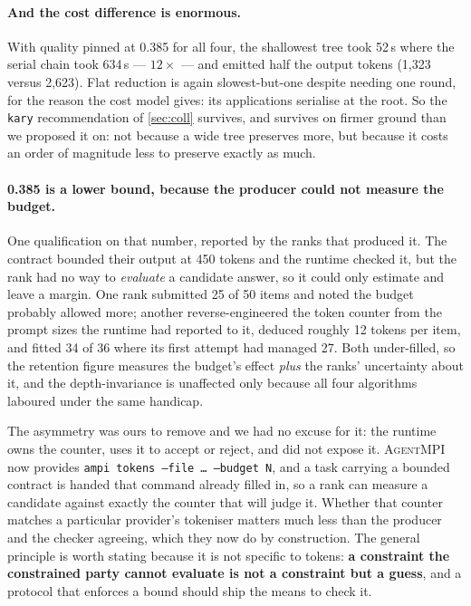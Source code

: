 \documentclass[10pt,twocolumn]{article}
\theoremstyle{definition}
\theoremstyle{plain}
\newcommand{\ampi}{\textsc{AgentMPI}}
\newcommand{\code}[1]{\texttt{\small #1}}
\begin{document}
\paragraph{And the cost difference is enormous.} With quality pinned at 0.385 for all
four, the shallowest tree took 52\,s where the serial chain took 634\,s ---
$12\times$ --- and emitted half the output tokens (1{,}323 versus 2{,}623). Flat reduction
is again slowest-but-one despite needing one round, for the reason the cost model gives:
its applications serialise at the root. So the \code{kary} recommendation of
\cref{sec:coll} survives, and survives on firmer ground than we proposed it on: not
because a wide tree preserves more, but because it costs an order of magnitude less to
preserve exactly as much.

\paragraph{0.385 is a lower bound, because the producer could not measure the budget.}
One qualification on that number, reported by the ranks that produced it. The contract
bounded their output at 450 tokens and the runtime checked it, but the rank had no way to
\emph{evaluate} a candidate answer, so it could only estimate and leave a margin. One rank
submitted 25 of 50 items and noted the budget probably allowed more; another
reverse-engineered the token counter from the prompt sizes the runtime had reported to it,
deduced roughly 12 tokens per item, and fitted 34 of 36 where its first attempt had
managed 27. Both under-filled, so the retention figure measures the budget's effect
\emph{plus} the ranks' uncertainty about it, and the depth-invariance is unaffected only
because all four algorithms laboured under the same handicap.

The asymmetry was ours to remove and we had no excuse for it: the runtime owns the
counter, uses it to accept or reject, and did not expose it. \ampi{} now provides
\code{ampi tokens --file … --budget N}, and a task carrying a bounded contract is handed
that command already filled in, so a rank can measure a candidate against exactly the
counter that will judge it. Whether that counter matches a particular provider's
tokeniser matters much less than the producer and the checker agreeing, which they now do
by construction. The general principle is worth stating because it is not specific to
tokens: \textbf{a constraint the constrained party cannot evaluate is not a constraint but
a guess}, and a protocol that enforces a bound should ship the means to check it.
\end{document}
